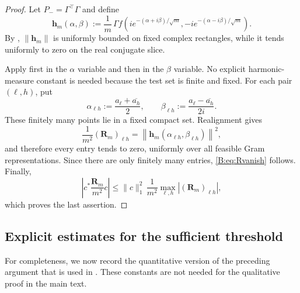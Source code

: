 \begin{proof}
Let $P_-=\Gamma^\top\Gamma$ and define
\[
 \mathbf h_m(\alpha,\beta)
 :=
 \frac1m\,
 \Gamma f\left(
 ie^{-(\alpha+i\beta)/\sqrt m},
 -ie^{-(\alpha-i\beta)/\sqrt m}
 \right).
\]
By , $\|\mathbf h_m\|$ is uniformly bounded on
fixed complex rectangles, while it tends uniformly to zero on the real
conjugate slice.

Apply  first in the $\alpha$ variable and then
in the $\beta$ variable.  No explicit harmonic-measure constant is
needed because the test set is finite and fixed.  For each pair
$(\ell,h)$, put
\[
 \alpha_{\ell h}:=
 \frac{a_\ell+\overline{a_h}}2,\qquad
 \beta_{\ell h}:=
 \frac{a_\ell-\overline{a_h}}{2i}.
\]
These finitely many points lie in a fixed compact set.  Realignment
gives
\[
 \frac1{m^2}(\mathbf R_m)_{\ell h}
 =
 \left\|
 \mathbf h_m(\alpha_{\ell h},\beta_{\ell h})
 \right\|^2,
\]
and therefore every entry tends to zero, uniformly over all feasible
Gram representations.  Since there are only finitely many entries,
\eqref{B:eq:Rvanish} follows.  Finally,
\[
 \left|
 c^*\frac{\mathbf R_m}{m^2}c
 \right|
 \le
 \|c\|_1^2\,
 \frac1{m^2}\max_{\ell,h}|(\mathbf R_m)_{\ell h}|,
\]
which proves the last assertion.
\end{proof}

\subsection{Explicit estimates for the sufficient threshold}
\label{B:subsec:effective}

For completeness, we now record the quantitative version of the preceding
argument that is used in .  These constants are not
needed for the qualitative proof in the main text.


